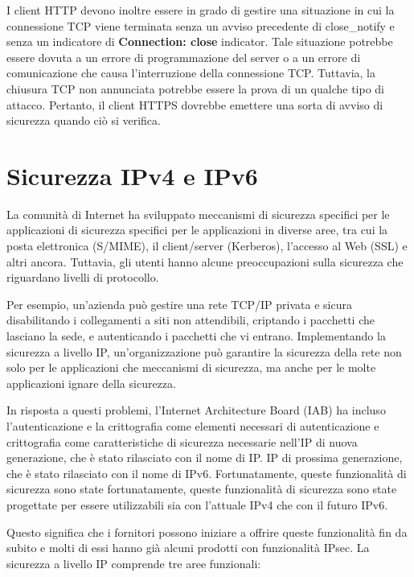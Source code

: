 \singlespacing

I client HTTP devono inoltre essere in grado di gestire una situazione in cui la connessione TCP viene terminata senza un avviso precedente di close\_notify e senza un indicatore di \textbf{Connection: close} indicator. Tale situazione potrebbe essere dovuta a un errore di programmazione del server o a un errore di comunicazione che causa l'interruzione della connessione TCP. Tuttavia, la chiusura TCP non annunciata potrebbe essere la prova di un qualche tipo di attacco.
Pertanto, il client HTTPS dovrebbe emettere una sorta di avviso di sicurezza quando ciò si verifica.

\section{Sicurezza IPv4 e IPv6 }
La comunità di Internet ha sviluppato meccanismi di sicurezza specifici per le applicazioni di sicurezza specifici per le applicazioni in diverse aree, tra cui la posta elettronica (S/MIME), il client/server (Kerberos), l'accesso al Web (SSL) e altri ancora.  Tuttavia, gli utenti hanno alcune preoccupazioni sulla sicurezza che riguardano livelli di protocollo. 

\singlespacing

Per esempio, un'azienda può gestire una rete TCP/IP privata e sicura disabilitando i collegamenti a siti non attendibili, criptando i pacchetti che lasciano la sede, e autenticando i pacchetti che vi entrano. Implementando la sicurezza a livello IP, un'organizzazione può garantire la sicurezza della rete non solo per le applicazioni che
meccanismi di sicurezza, ma anche per le molte applicazioni ignare della sicurezza.

\singlespacing

In risposta a questi problemi, l'Internet Architecture Board (IAB) ha incluso l'autenticazione e la crittografia come elementi necessari di autenticazione e crittografia come caratteristiche di sicurezza necessarie nell'IP di nuova generazione, che è stato rilasciato con il nome di IP. 
IP di prossima generazione, che è stato rilasciato con il nome di IPv6. Fortunatamente, queste funzionalità di sicurezza sono state fortunatamente, queste funzionalità di sicurezza sono state progettate per essere utilizzabili sia con l'attuale IPv4 che con il futuro IPv6. 

\singlespacing

Questo significa che i fornitori possono iniziare a offrire queste funzionalità fin da subito e molti di essi hanno già
alcuni prodotti con funzionalità IPsec.
La sicurezza a livello IP comprende tre aree funzionali:

